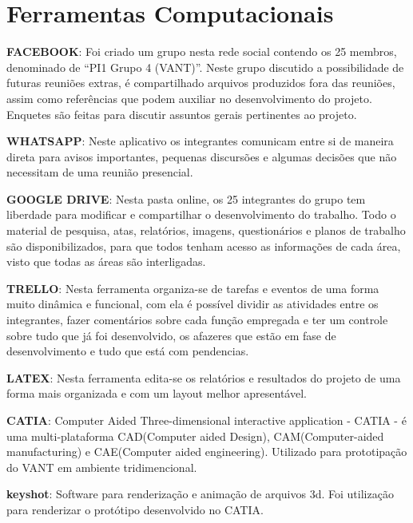 \section{Ferramentas Computacionais}

\textbf{FACEBOOK}:
Foi criado um grupo nesta rede social contendo os 25 membros, denominado de “PI1 Grupo 4 (VANT)”. Neste grupo discutido a possibilidade de futuras reuniões extras, é compartilhado arquivos produzidos fora das reuniões, assim como referências que podem auxiliar no desenvolvimento do projeto. Enquetes são feitas para discutir assuntos gerais pertinentes ao projeto. 

\textbf{WHATSAPP}: 
Neste aplicativo os integrantes comunicam entre si de maneira direta para avisos importantes, pequenas discursões e algumas decisões que não necessitam de uma reunião presencial.

\textbf{GOOGLE DRIVE}: 
Nesta pasta online, os 25 integrantes do grupo tem liberdade para modificar e compartilhar o desenvolvimento do trabalho. Todo o material de pesquisa, atas, relatórios, imagens, questionários e planos de trabalho são disponibilizados, para que todos tenham acesso as informações de cada área, visto que todas as áreas são interligadas.

\textbf{TRELLO}:
Nesta ferramenta organiza-se de tarefas e eventos de uma forma muito dinâmica e funcional, com ela é possível dividir as atividades entre os integrantes, fazer comentários sobre cada função empregada e ter um controle sobre tudo que já foi desenvolvido, os afazeres que estão em fase de desenvolvimento e tudo que está com pendencias.

\textbf{LATEX}:
Nesta ferramenta edita-se os relatórios e resultados do projeto de uma forma mais organizada e com um layout melhor apresentável.

\textbf{CATIA}:
Computer Aided Three-dimensional interactive application - CATIA - é uma multi-plataforma CAD(Computer aided Design), CAM(Computer-aided manufacturing) e CAE(Computer aided engineering). Utilizado para prototipação do VANT em ambiente tridimencional.

\textbf{keyshot}:
Software para renderização e animação de arquivos 3d. Foi utilização para renderizar o protótipo desenvolvido no CATIA.

